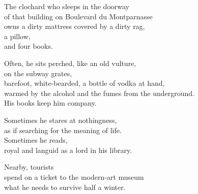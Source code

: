 \documentclass[12pt,twoside]{article}
\begin{document}
\begin{poem}
\begin{stanza}
The clochard who sleeps in the doorway\\
of that building on Boulevard du Montparnasse\\
owns a dirty mattress covered by a dirty rag,\\
a pillow,\\
and four books.
\end{stanza}
\begin{stanza}
Often, he sits perched, like an old vulture,\\
on the subway grates,\\
barefoot, white-bearded, a bottle of vodka at hand,\\
warmed by the alcohol and the fumes from the underground.\\
His books keep him company.
\end{stanza}
\begin{stanza}
Sometimes he stares at nothingness,\\
as if searching for the meaning of life.\\
Sometimes he reads,\\
royal and languid as a lord in his library.
\end{stanza}
\begin{stanza}
Nearby, tourists\\
spend on a ticket to the modern-art museum\\
what he needs to survive half a winter.
\end{stanza}
\end{poem}
\end{document}
